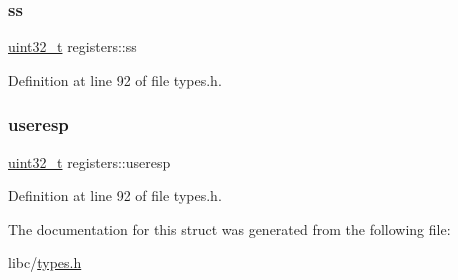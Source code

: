 \subsubsection{\texorpdfstring{ss}{ss}}
{\footnotesize\ttfamily \hyperlink{a00134_a435d1572bf3f880d55459d9805097f62_a435d1572bf3f880d55459d9805097f62}{uint32\+\_\+t} registers\+::ss}



Definition at line 92 of file types.\+h.

\mbox{\label{a00252_ad4734529e5faf04f6c61cfabfe4324e9_ad4734529e5faf04f6c61cfabfe4324e9}} 
\subsubsection{\texorpdfstring{useresp}{useresp}}
{\footnotesize\ttfamily \hyperlink{a00134_a435d1572bf3f880d55459d9805097f62_a435d1572bf3f880d55459d9805097f62}{uint32\+\_\+t} registers\+::useresp}



Definition at line 92 of file types.\+h.



The documentation for this struct was generated from the following file\+:\begin{DoxyCompactItemize}
\item 
libc/\hyperlink{a00134}{types.\+h}\end{DoxyCompactItemize}

